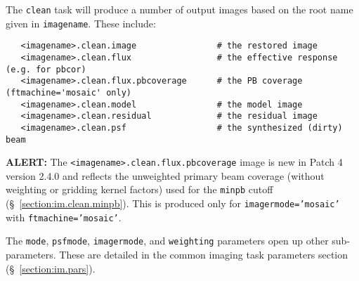 The {\tt clean} task will produce a number of output images based
on the root name given in {\tt imagename}.  
These include:
\small
\begin{verbatim}
   <imagename>.clean.image                # the restored image
   <imagename>.clean.flux                 # the effective response (e.g. for pbcor)
   <imagename>.clean.flux.pbcoverage      # the PB coverage (ftmachine='mosaic' only)
   <imagename>.clean.model                # the model image
   <imagename>.clean.residual             # the residual image
   <imagename>.clean.psf                  # the synthesized (dirty) beam
\end{verbatim}
\normalsize
{\bf ALERT:} The {\tt <imagename>.clean.flux.pbcoverage} image is
new in Patch 4 version 2.4.0 and reflects the unweighted primary beam
coverage (without weighting or gridding kernel factors) used for
the {\tt minpb} cutoff (\S~\ref{section:im.clean.minpb}).  This is
produced only for {\tt imagermode='mosaic'} with {\tt ftmachine='mosaic'}.

The {\tt mode}, {\tt psfmode}, {\tt imagermode}, and {\tt weighting}
parameters open up other sub-parameters.  These are detailed
in the common imaging task parameters section
(\S~\ref{section:im.pars}).

